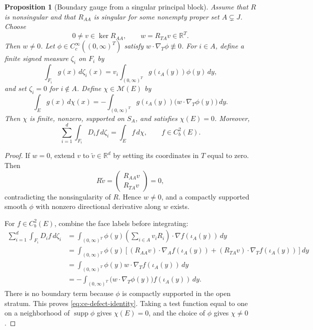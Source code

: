 \documentclass[aihp]{imsart}
\numberwithin{equation}{section}
\theoremstyle{plain}
\newtheorem{proposition}[proposition]{Proposition}
\theoremstyle{definition}
\newcommand{\cM}{\mathcal M}
\newcommand{\supp}{\operatorname{supp}}
\newcommand{\1}{\mathbf 1}
\begin{document}
\begin{proposition}[Boundary gauge from a singular principal block]\label{prop:singular-block-gauge}
Assume that $R$ is nonsingular and that $R_{AA}$ is singular for some nonempty proper set $A\subsetneq J$. Choose
\[
 0\ne v\in\ker R_{AA},\qquad w=R_{TA}v\in\mathbb R^T.
\]
Then $w\ne0$. Let $\phi\in C_c^\infty((0,\infty)^T)$ satisfy $w\cdot\nabla_T\phi\not\equiv0$. For $i\in A$, define a finite signed measure $\zeta_i$ on $F_i$ by
\begin{equation}\label{eq:ce-zeta-general}
 \int_{F_i}g(x)\,d\zeta_i(x)
 =v_i\int_{(0,\infty)^T}g(\iota_A(y))\phi(y)\,dy,
\end{equation}
and set $\zeta_i=0$ for $i\notin A$. Define $\chi\in\cM(E)$ by
\begin{equation}\label{eq:ce-source-general}
 \int_E g(x)\,d\chi(x)
 =-\int_{(0,\infty)^T}g(\iota_A(y))
       \bigl(w\cdot\nabla_T\phi(y)\bigr)\,dy.
\end{equation}
Then $\chi$ is finite, nonzero, supported on $S_A$, and satisfies $\chi(E)=0$. Moreover,
\begin{equation}\label{eq:ce-defect-identity}
 \sum_{i=1}^d\int_{F_i}D_i f\,d\zeta_i
 =\int_E f\,d\chi,
 \qquad f\in C_b^2(E).
\end{equation}
\end{proposition}

\begin{proof}
If $w=0$, extend $v$ to $\widetilde v\in\mathbb R^d$ by setting its coordinates in $T$ equal to zero. Then
\[
 R\widetilde v=
 \begin{pmatrix}R_{AA}v\\ R_{TA}v\end{pmatrix}=0,
\]
contradicting the nonsingularity of $R$. Hence $w\ne0$, and a compactly supported smooth $\phi$ with nonzero directional derivative along $w$ exists.

For $f\in C_b^2(E)$, combine the face labels before integrating:
\begin{align*}
\sum_{i=1}^d\int_{F_i}D_i f\,d\zeta_i
 &=\int_{(0,\infty)^T}\phi(y)
       \left(\sum_{i\in A}v_iR_i\right)\cdot
       \nabla f(\iota_A(y))\,dy\\
 &=\int_{(0,\infty)^T}\phi(y)
       \left[(R_{AA}v)\cdot\nabla_A f(\iota_A(y))
             +(R_{TA}v)\cdot\nabla_T f(\iota_A(y))\right]dy\\
 &=\int_{(0,\infty)^T}\phi(y)w\cdot\nabla_T f(\iota_A(y))\,dy\\
 &=-\int_{(0,\infty)^T}
       \bigl(w\cdot\nabla_T\phi(y)\bigr)f(\iota_A(y))\,dy.
\end{align*}
There is no boundary term because $\phi$ is compactly supported in the open stratum. This proves \eqref{eq:ce-defect-identity}. Taking a test function equal to one on a neighborhood of $\supp\phi$ gives $\chi(E)=0$, and the choice of $\phi$ gives $\chi\ne0$.
\end{proof}
\end{document}
